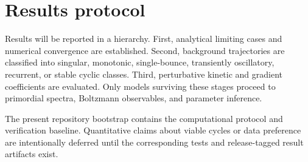 \section{Results protocol}
\label{sec:results}

Results will be reported in a hierarchy. First, analytical limiting cases and numerical convergence are established. Second, background trajectories are classified into singular, monotonic, single-bounce, transiently oscillatory, recurrent, or stable cyclic classes. Third, perturbative kinetic and gradient coefficients are evaluated. Only models surviving these stages proceed to primordial spectra, Boltzmann observables, and parameter inference.

The present repository bootstrap contains the computational protocol and verification baseline. Quantitative claims about viable cycles or data preference are intentionally deferred until the corresponding tests and release-tagged result artifacts exist.
